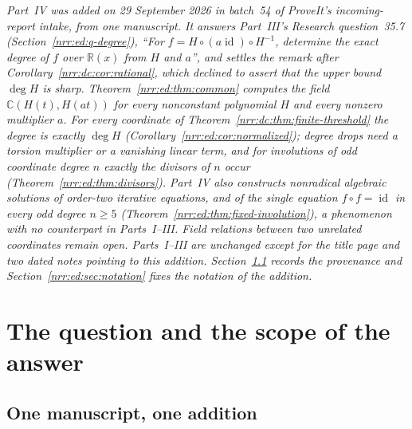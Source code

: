 \documentclass[11pt,letterpaper]{article}
\theoremstyle{definition}
\theoremstyle{remark}
\newcommand{\R}{\mathbb R}
\newcommand{\C}{\mathbb C}
\newcommand{\id}{\operatorname{id}}
\begin{document}
\noindent\emph{Part~IV was added on 29 September 2026 in batch~54 of
ProveIt's incoming-report intake, from one manuscript. It answers Part~III's
Research question~35.7 (Section~\ref{nrr:ed:q-degree}), ``For
$f=H\circ(a\id)\circ H^{-1}$, determine the exact degree of $f$ over $\R(x)$
from $H$ and $a$'', and settles the remark after
Corollary~\ref{nrr:dc:cor:rational}, which declined to assert that the upper
bound $\deg H$ is sharp. Theorem~\ref{nrr:ed:thm:common} computes the field
$\C(H(t),H(at))$ for every nonconstant polynomial $H$ and every nonzero
multiplier $a$. For every coordinate of
Theorem~\ref{nrr:dc:thm:finite-threshold} the degree is exactly $\deg H$
(Corollary~\ref{nrr:ed:cor:normalized}); degree drops need a torsion
multiplier or a vanishing linear term, and for involutions of odd coordinate
degree $n$ exactly the divisors of $n$ occur
(Theorem~\ref{nrr:ed:thm:divisors}). Part~IV also constructs nonradical
algebraic solutions of order-two iterative equations, and of the single
equation $f\circ f=\id$ in every odd degree $n\ge5$
(Theorem~\ref{nrr:ed:thm:fixed-involution}), a phenomenon with no
counterpart in Parts~I--III. Field relations between two unrelated
coordinates remain open. Parts~I--III are unchanged except for the title page
and two dated notes pointing to this addition.
Section~\ref{nrr:ed:sec:source} records the provenance and
Section~\ref{nrr:ed:sec:notation} fixes the notation of the addition.}

\section{The question and the scope of the answer}
\label{nrr:ed:sec:scope}

\subsection{One manuscript, one addition}
\label{nrr:ed:sec:source}
\end{document}
